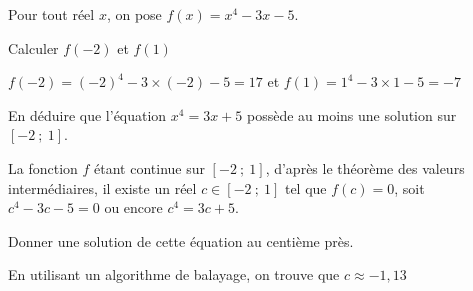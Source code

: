 \documentclass[11pt,a4paper]{article}  %
\begin{document}

Pour tout réel $x$, on pose $f(x)=x^4-3 x-5$.
\begin{enumMet}
	\item {} Calculer $f(-2)$ et $f(1)$
	\begin{corrBox}
		$f(-2)=(-2)^4-3\times (-2)-5=17$ et $f(1)=1^4-3\times 1-5=-7$		
	\end{corrBox}
	\item {} En déduire que l'équation $x^4=3 x+5$ possède au moins une solution sur $[-2\ ;\ 1]$.
	\begin{corrBox}
		La fonction $f$ étant continue sur $[-2\ ;\ 1]$, d'après le théorème des valeurs intermédiaires, il existe un réel $c \in[-2\ ;\ 1]$ tel que $f(c)=0$, soit $c^4-3 c-5=0$ ou encore $c^4=3c+5$.		
	\end{corrBox}
	\item {} Donner une solution de cette équation au centième près.
	\begin{corrBox}
		En utilisant un algorithme de balayage, on trouve que $c \approx -1,13$		
	\end{corrBox}
\end{enumMet}

\end{document}
